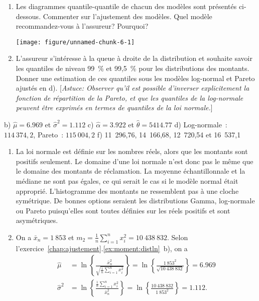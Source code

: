 \begin{exercice}
\begin{enumerate}
\item Les diagrammes quantile-quantile de chacun des modèles sont présentés ci-dessous. Commenter sur l'ajustement des modèles. Quel modèle recommandez-vous à l'assureur? Pourquoi?

\begin{knitrout}
\color{fgcolor}
\texttt{[image: figure/unnamed-chunk-6-1]} 
\end{knitrout}

\item L'assureur s'intéresse à la queue à droite de la distribution et souhaite savoir les quantiles de niveau 99~\% et 99,5~\% pour les distributions des montants. Donner une estimation de ces quantiles sous les modèles log-normal et Pareto ajustés en d). [\emph{Astuce: Observer qu'il est possible d'inverser explicitement la fonction de répartition de la Pareto, et que les quantiles de la log-normale peuvent être exprimés en termes de quantiles de la loi normale.}]

\end{enumerate}
\begin{rep}
b) $\hat \mu =6.969$ et $\hat\sigma^2 =1.112$ 
c) $\hat\alpha =3.922$ et 
$\hat\theta=5414.77$
d) Log-normale~: $114~374,2$, Pareto~: $115~004,2$
f) 11~296,76,  14~166,68,  12~720,54  et  16~537,1
\end{rep}
\begin{sol}
\begin{enumerate}

\item La loi normale est définie sur les nombres réels, alors que les montants sont positifs seulement. Le domaine d'une loi normale n'est donc pas le même que le domaine des montants de réclamation. La moyenne échantillonnale et la médiane ne sont pas égales, ce qui serait le cas si le modèle normal était approprié. L'histogramme des montants ne ressemblent pas à une cloche symétrique. De bonnes options seraient les distributions Gamma, log-normale ou Pareto puisqu'elles sont toutes définies sur les réels positifs et sont asymétriques.

\item On a $\bar x_n=1~853$ et $m_2=\frac{1}{n}\sum_{i=1}^n x_i^2 = 10~438~832$. Selon l'exercice~\ref{chap:ajustement}.\ref{ex:moment:distln}~b), on a
\begin{align*}
\hat \mu &= \ln\left\{\frac{\bar x_n^2}{\sqrt{\frac{1}{n}\sum_{i=1}^n x_i^2}} \right\}=\ln\left\{\frac{1~853^2}{\sqrt{10~438~832}} \right\}=6.969\\
\hat\sigma^2 &= \ln\left\{\frac{\frac{1}{n}\sum_{i=1}^n x_i^2}{\bar x_n^2} \right\}=  \ln\left\{\frac{10~438~832}{1~853^2} \right\}=1.112.
\end{align*}



\end{enumerate}
\end{sol}
\end{exercice}
